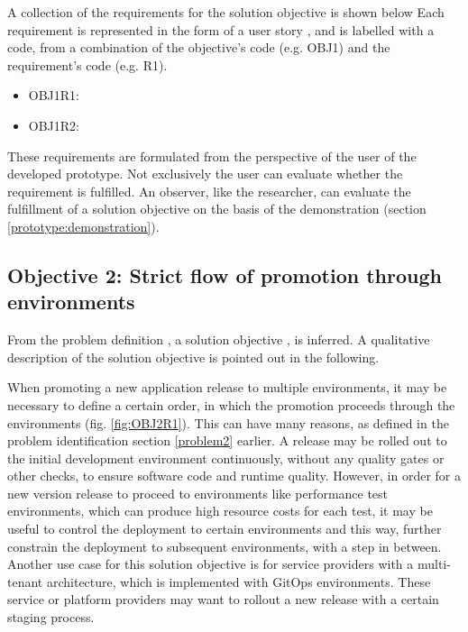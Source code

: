 A collection of the requirements for the solution objective is shown below
Each requirement is represented in the form of a user story
\autocite{userStoriesCohn2004user},
and is labelled with a code, from a combination of the
objective's code (e.g. OBJ1) and the requirement's code (e.g. R1).

\begin{itemize}
	\item OBJ1R1: 
	\item OBJ1R2: 
\end{itemize}

These requirements are formulated from the perspective of the user of the developed prototype.
Not exclusively the user can evaluate whether the requirement is fulfilled.
An observer, like the researcher, can evaluate the fulfillment of a solution objective
on the basis of the demonstration (section \ref{prototype:demonstration}).

\subsection{Objective 2: Strict flow of promotion through environments}
\label{objective2}

From the problem definition
,
a solution objective
,
is inferred.
A qualitative description of the solution objective
is pointed out in the following.

When promoting a new application release to multiple environments,
it may be necessary to define a certain order, in which the promotion proceeds
through the environments (fig. \ref{fig:OBJ2R1}).
This can have many reasons,
as defined in the problem identification section \ref{problem2} earlier.
A release may be rolled out to the initial development environment continuously,
without any quality gates or other checks, to ensure software code and runtime quality.
However, in order for a new version release to proceed to environments like
performance test environments, which can produce high resource costs for each test,
it may be useful to control the deployment to certain environments and this way, further constrain
the deployment to subsequent environments, with a step in between.
Another use case for this solution objective is for service providers
with a multi-tenant architecture, which is implemented with GitOps environments.
These service or platform providers may want to rollout a new release with a certain staging process.


